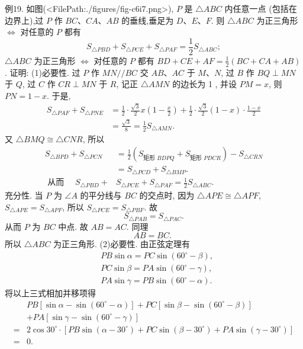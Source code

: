 例19. 如图(<FilePath:./figures/fig-c6i7.png>), $P$ 是 $\triangle A B C$ 内任意一点  (包括在边界上),过 $P$ 作 $B C 、 C A 、 A B$ 的垂线,垂足为 $D 、 E 、 F$. 则
 $\triangle A B C$ 为正三角形 $\Leftrightarrow$ 对任意的 $P$ 都有
$$
S_{\triangle P B D}+S_{\triangle P C E}+S_{\triangle P A F}=\frac{1}{2} S_{\triangle A B C} ;
$$
 $\triangle A B C$ 为正三角形 $\Leftrightarrow$ 对任意的 $P$ 都有
$B D+C E+A F=\frac{1}{2}(B C+C A+A B)$.
证明: (1)必要性.
过 $P$ 作 $M N / / B C$ 交 $A B 、 A C$ 于 $M 、 N$, 过 $B$ 作 $B Q \perp M N$ 于 $Q$, 过 $C$ 作 $C R \perp M N$ 于 $R$, 记正 $\triangle A M N$ 的边长为 1 , 并设 $P M=x$, 则 $P N=1-x$. 于是,
$$
\begin{aligned}
S_{\triangle P A F}+S_{\triangle P N E} & =\frac{1}{2} \cdot \frac{\sqrt{3}}{2} x\left(1-\frac{x}{2}\right)+\frac{1}{2} \cdot \frac{\sqrt{3}}{2}(1-x) \cdot \frac{1-x}{2} \\
& =\frac{\sqrt{3}}{8}=\frac{1}{2} S_{\triangle A M N} .
\end{aligned}
$$
又 $\triangle B M Q \cong \triangle C N R$, 所以
$$
\begin{aligned}
S_{\triangle B P D}+S_{\triangle P C N} & =\frac{1}{2}\left(S_{\text {矩形 } B D P Q}+S_{\text {矩形 } P D C R}\right)-S_{\triangle C R N} \\
& =S_{\triangle P C D}+S_{\triangle B M P} . \\
\text { 从而 } \quad S_{\triangle P B D}+ & S_{\triangle P C E}+S_{\triangle P A F}=\frac{1}{2} S_{\triangle A B C} .
\end{aligned}
$$
充分性.
当 $P$ 为 $\angle A$ 的平分线与 $B C$ 的交点时, 因为 $\triangle A P E \cong \triangle A P F$, $S_{\triangle A P E}=S_{\triangle A P F}$, 所以 $S_{\triangle P C E}=S_{\triangle P B F}$.
故
$$
S_{\triangle P A B}=S_{\triangle P A C} .
$$
从而 $P$ 为 $B C$ 中点.
故 $A B=A C$.
同理
$$
A B=B C \text {. }
$$
所以 $\triangle A B C$ 为正三角形.
 (2)必要性.
由正弦定理有
$$
\begin{aligned}
& P B \sin \alpha=P C \sin \left(60^{\circ}-\beta\right), \\
& P C \sin \beta=P A \sin \left(60^{\circ}-\gamma\right), \\
& P A \sin \gamma=P B \sin \left(60^{\circ}-\alpha\right) .
\end{aligned}
$$
将以上三式相加并移项得
$$
\begin{aligned}
& P B\left[\sin \alpha-\sin \left(60^{\circ}-\alpha\right)\right]+P C\left[\sin \beta-\sin \left(60^{\circ}-\beta\right)\right] \\
& +P A\left[\sin \gamma-\sin \left(60^{\circ}-\gamma\right)\right] \\
= & 2 \cos 30^{\circ} \cdot\left[P B \sin \left(\alpha-30^{\circ}\right)+P C \sin \left(\beta-30^{\circ}\right)+P A \sin \left(\gamma-30^{\circ}\right)\right] \\
= & 0 .
\end{aligned}
$$
